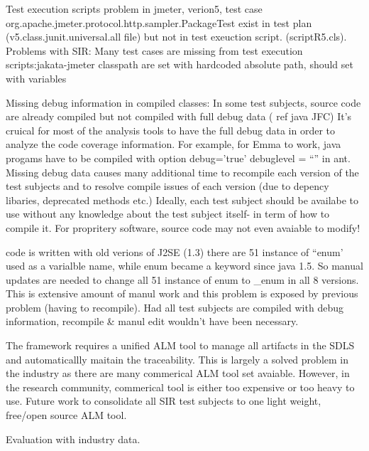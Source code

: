 Test execution scripts problem
in jmeter, verion5, test case org.apache.jmeter.protocol.http.sampler.PackageTest
exist in test plan (v5.class.junit.universal.all file) but not in test
exeuction script. (scriptR5.cls).
Problems with SIR:
Many test cases are missing from test execution scripts:jakata-jmeter
classpath are set with hardcoded absolute path, should set with variables
 
Missing debug information in compiled classes:
In some test subjects, source code are already compiled but not compiled with
full debug data ( ref java JFC) It's cruical for most of the
analysis tools to have the full debug data in order to analyze the code
coverage information. For example, for Emma to work, java progams have to be
compiled with option debug='true' debuglevel = ``'' in ant.
Missing debug data causes many additional time to recompile each version of the
test subjects and to resolve compile issues of each version (due to depency
libaries, deprecated methods etc.) Ideally, each test subject should be availabe
to use without any knowledge about the test subject itself- in term of how to
compile it. For propritery software, source code may not even avaiable to
modify!

code is written with old verions of J2SE (1.3)
there are 51 instance of ``enum' used as a varialble name, while enum became a
keyword since java 1.5. So manual updates are needed to change all 51 instance
of enum to _enum in all 8 versions. This is extensive amount of manul work and
this problem is exposed by previous problem (having to recompile). Had all test
subjects are compiled with debug information, recompile & manul edit wouldn't
have been necessary. 


The framework requires a unified ALM tool to manage all artifacts in the SDLS
and automaticallly maitain the traceability. This is largely a solved problem in
the industry as there are many commerical ALM tool set avaiable. However, in the
research community, commerical tool is either  too expensive or too heavy to
use. Future work to consolidate all SIR test subjects to one light weight,
free/open source ALM tool.


Evaluation with industry data. 


%
%




